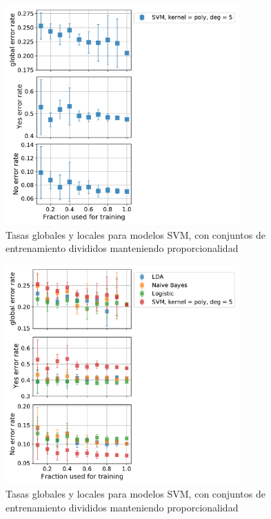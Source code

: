 \documentclass[11pt]{article}
\begin{document}
\begin{figure}[H]
    \centering
    \includegraphics[width = 0.8\textwidth]{1-svm-fin-eq-sizeDependence.pdf}
    \caption{Tasas globales y locales para modelos SVM, con conjuntos de entrenamiento divididos manteniendo proporcionalidad}
    \label{1-svm-fin-eq-sizeDependence}
\end{figure}
\begin{figure}[H]
    \centering
    \includegraphics[width = 0.8\textwidth]{1-final-sizeDependence.pdf}
    \caption{Tasas globales y locales para modelos SVM, con conjuntos de entrenamiento divididos manteniendo proporcionalidad}
    \label{1-final-sizeDependence}
\end{figure}
\end{document}
